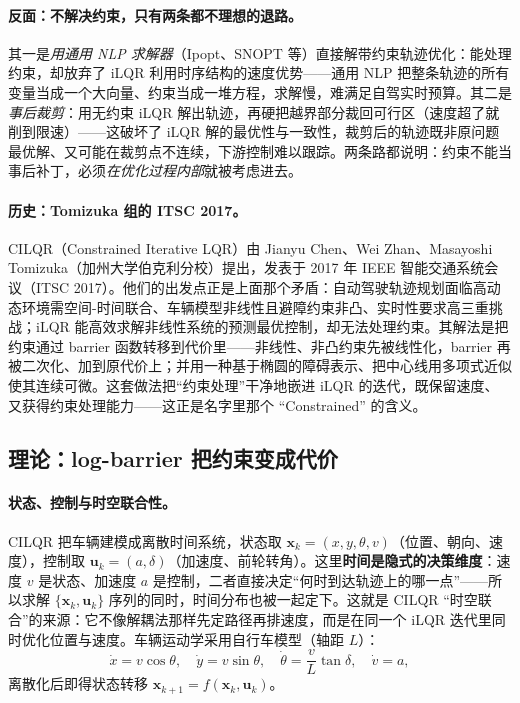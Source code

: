 \paragraph{反面：不解决约束，只有两条都不理想的退路。}
其一是\emph{用通用 NLP 求解器}（Ipopt、SNOPT 等）直接解带约束轨迹优化：能处理约束，却放弃了 iLQR 利用时序结构的速度优势——通用 NLP 把整条轨迹的所有变量当成一个大向量、约束当成一堆方程，求解慢，难满足自驾实时预算。其二是\emph{事后裁剪}：用无约束 iLQR 解出轨迹，再硬把越界部分裁回可行区（速度超了就削到限速）——这破坏了 iLQR 解的最优性与一致性，裁剪后的轨迹既非原问题最优解、又可能在裁剪点不连续，下游控制难以跟踪。两条路都说明：约束不能当事后补丁，必须\emph{在优化过程内部}就被考虑进去。

\paragraph{历史：Tomizuka 组的 ITSC 2017。}
CILQR（Constrained Iterative LQR）由 Jianyu Chen、Wei Zhan、Masayoshi Tomizuka（加州大学伯克利分校）提出，发表于 2017 年 IEEE 智能交通系统会议（ITSC 2017）\cite{chen2017cilqr}。他们的出发点正是上面那个矛盾：自动驾驶轨迹规划面临高动态环境需空间-时间联合、车辆模型非线性且避障约束非凸、实时性要求高三重挑战；iLQR 能高效求解非线性系统的预测最优控制，却无法处理约束。其解法是把约束通过 barrier 函数转移到代价里——非线性、非凸约束先被线性化，barrier 再被二次化、加到原代价上；并用一种基于椭圆的障碍表示、把中心线用多项式近似使其连续可微。这套做法把“约束处理”干净地嵌进 iLQR 的迭代，既保留速度、又获得约束处理能力——这正是名字里那个 “Constrained” 的含义。

\subsection{理论：log-barrier 把约束变成代价}
\label{sec:st-cilqr-theory}

\paragraph{状态、控制与时空联合性。}
CILQR 把车辆建模成离散时间系统，状态取 $\mathbf x_k=(x,y,\theta,v)$（位置、朝向、速度），控制取 $\mathbf u_k=(a,\delta)$（加速度、前轮转角）\cite{chen2017cilqr}。这里\textbf{时间是隐式的决策维度}：速度 $v$ 是状态、加速度 $a$ 是控制，二者直接决定“何时到达轨迹上的哪一点”——所以求解 $\{\mathbf x_k,\mathbf u_k\}$ 序列的同时，时间分布也被一起定下。这就是 CILQR “时空联合”的来源：它不像解耦法那样先定路径再排速度，而是在同一个 iLQR 迭代里同时优化位置与速度。车辆运动学采用自行车模型（轴距 $L$）：
\begin{equation}
  \dot x=v\cos\theta,\quad \dot y=v\sin\theta,\quad \dot\theta=\frac{v}{L}\tan\delta,\quad \dot v=a,
  \label{eq:st-bicycle}
\end{equation}
离散化后即得状态转移 $\mathbf x_{k+1}=f(\mathbf x_k,\mathbf u_k)$。

